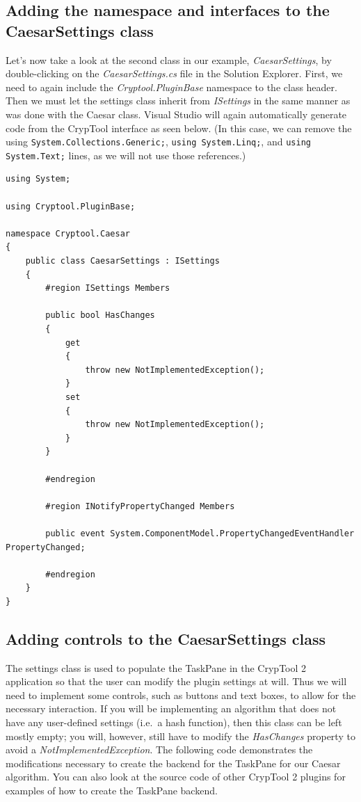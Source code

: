 \subsection{Adding the namespace and interfaces to the CaesarSettings class}
\label{sec:AddingTheNamespaceAndInterfacesToTheCaesarSettingsClass}

Let's now take a look at the second class in our example, \textit{CaesarSettings}, by double-clicking on the \textit{CaesarSettings.cs} file in the Solution Explorer. First, we need to again include the \textit{Cryptool.PluginBase} namespace to the class header. Then we must let the settings class inherit from \textit{ISettings} in the same manner as was done with the Caesar class. Visual Studio will again automatically generate code from the CrypTool interface as seen below. (In this case, we can remove the using \texttt{System.Collections.Generic;}, \texttt{using System.Linq;}, and \texttt{using System.Text;} lines, as we will not use those references.)
\clearpage

\begin{lstlisting}
using System;

using Cryptool.PluginBase;

namespace Cryptool.Caesar
{
    public class CaesarSettings : ISettings
    {
        #region ISettings Members

        public bool HasChanges
        {
            get
            {
                throw new NotImplementedException();
            }
            set
            {
                throw new NotImplementedException();
            }
        }

        #endregion

        #region INotifyPropertyChanged Members

        public event System.ComponentModel.PropertyChangedEventHandler PropertyChanged;

        #endregion
    }
}
\end{lstlisting}

\subsection{Adding controls to the CaesarSettings class}
\label{sec:AddingControlsToTheCaesarSettingsClass}

The settings class is used to populate the TaskPane in the CrypTool 2 application so that the user can modify the plugin settings at will. Thus we will need to implement some controls, such as buttons and text boxes, to allow for the necessary interaction. If you will be implementing an algorithm that does not have any user-defined settings (i.e.\ a hash function), then this class can be left mostly empty; you will, however, still have to modify the \textit{HasChanges} property to avoid a \textit{NotImplementedException}. The following code demonstrates the modifications necessary to create the backend for the TaskPane for our Caesar algorithm. You can also look at the source code of other CrypTool 2 plugins for examples of how to create the TaskPane backend.\\

